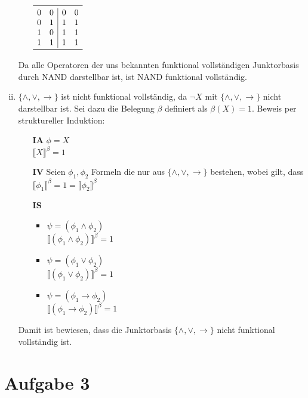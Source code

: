 \documentclass[a4paper,10pt]{article}
\begin{document}
\begin{enumerate}[(i)]
\begin{itemize}
\begin{math}
\begin{array}{cc|cc}
\midrule
0 & 0 & 0 & 0 \\
0 & 1 & 1 & 1 \\
1 & 0 & 1 & 1 \\
1 & 1 & 1 & 1 \\
\bottomrule
\end{array}
\end{math}
\end{itemize}
Da alle Operatoren der uns bekannten funktional vollständigen Junktorbasis durch \textsf{NAND} darstellbar ist, ist \textsf{NAND} funktional vollständig.
\item $\{\land, \lor, \rightarrow \}$ ist nicht funktional vollständig, da $\lnot X$ mit $\{\land, \lor, \rightarrow \}$  nicht darstellbar ist. Sei dazu die Belegung $\beta$ definiert als $\beta(X) = 1$.
Beweis per struktureller Induktion:
\begin{itemize}
\item[\textbf{IA}] $\phi = X$ \\
$\llbracket X \rrbracket^{\beta} = 1$
\item[\textbf{IV}] Seien $\phi_1, \phi_2$ Formeln die nur aus   $\{\land, \lor, \rightarrow \}$ bestehen, wobei gilt, dass $\llbracket \phi_1 \rrbracket^{\beta} = 1 = \llbracket \phi_2 \rrbracket^{\beta} $
\item[\textbf{IS}] 
\begin{itemize}
\item $\psi = (\phi_1 \land \phi_2)$ \\
$\llbracket  (\phi_1 \land \phi_2) \rrbracket^\beta = 1$
\item $\psi = (\phi_1 \lor \phi_2)$ \\
$\llbracket  (\phi_1 \lor\phi_2) \rrbracket^\beta = 1$
\item $\psi = (\phi_1 \rightarrow \phi_2)$ \\
$\llbracket  (\phi_1 \rightarrow \phi_2) \rrbracket^\beta = 1$
\end{itemize}
\end{itemize}
Damit ist bewiesen, dass die Junktorbasis $\{\land, \lor, \rightarrow \}$ nicht funktional vollständig ist.
\end{enumerate}

\section*{Aufgabe 3}
\end{document}
